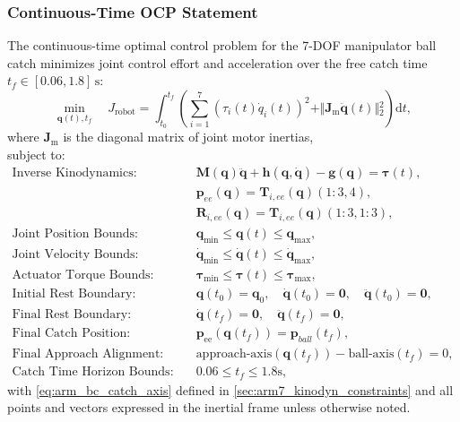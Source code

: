 \subsubsection{Continuous-Time OCP Statement}
The continuous-time optimal control problem for the 7-\ac{DOF} manipulator ball catch minimizes joint control effort and acceleration over the free catch time $t_f \in [0.06, 1.8]\,\text{s}$:   
\begin{equation}
\min_{\mathbf{q}(t), t_f} \quad J_{\text{robot}} = \int_{t_0}^{t_f} \left( \sum_{i=1}^{7} \left( \tau_i(t) \dot{q}_i(t) \right)^2 + \Vert{}\mathbf{J}_{\mathrm{m}}\ddot{\mathbf{q}}(t)\Vert{}_2^2 \right) \mathrm{d}t,
\label{eq:arm7_ocp_objective}
\end{equation}
where $\mathbf{J}_{\mathrm{m}}$ is the diagonal matrix of joint motor inertias, \\
subject to:
\begin{align}
\text{Inverse Kinodynamics:} \quad & \mathbf{M}(\mathbf{q})\ddot{\mathbf{q}} + \mathbf{h}(\mathbf{q}, \dot{\mathbf{q}}) - \mathbf{g}(\mathbf{q}) = \boldsymbol{\tau}(t), \label{eq:arm_dyn_constr} \\
                             \quad & \mathbf{p}_{ee}(\mathbf{q}) = \mathbf{T}_{i,ee}(\mathbf{q})(1\!:\!3,4), \\
                             \quad & \mathbf{R}_{i,ee}(\mathbf{q}) = \mathbf{T}_{i,ee}(\mathbf{q})(1\!:\!3,1\!:\!3), \\
\text{Joint Position Bounds:} \quad & \mathbf{q}_{\min} \le \mathbf{q}(t) \le \mathbf{q}_{\max}, \label{eq:arm_q_bounds} \\
\text{Joint Velocity Bounds:} \quad & \dot{\mathbf{q}}_{\min} \le \dot{\mathbf{q}}(t) \le \dot{\mathbf{q}}_{\max}, \label{eq:arm_dq_bounds} \\
\text{Actuator Torque Bounds:} \quad & \boldsymbol{\tau}_{\min} \le \boldsymbol{\tau}(t) \le \boldsymbol{\tau}_{\max}, \label{eq:arm_tau_bounds} \\
\text{Initial Rest Boundary:} \quad & \mathbf{q}(t_0) = \mathbf{q}_0, \quad \dot{\mathbf{q}}(t_0) = \mathbf{0}, \quad \ddot{\mathbf{q}}(t_0) = \mathbf{0}, \label{eq:arm_bc_start} \\
\text{Final Rest Boundary:} \quad & \dot{\mathbf{q}}(t_f) = \mathbf{0}, \quad \ddot{\mathbf{q}}(t_f) = \mathbf{0}, \label{eq:arm_bc_terminal_kin} \\
\text{Final Catch Position:} \quad & \mathbf{p}_{\text{ee}}(\mathbf{q}(t_f)) = \mathbf{p}_{ball}(t_f), \label{eq:arm_bc_catch_pos} \\
\text{Final Approach Alignment:} \quad & \text{approach-axis}(\mathbf{q}(t_f)) - \text{ball-axis}(t_f) = 0, \label{eq:arm_bc_catch_axis} \\
\text{Catch Time Horizon Bounds:} \quad & 0.06 \le t_f \le 1.8 \text{s}, \label{eq:arm_tf_bounds}
\end{align} 
with \cref{eq:arm_bc_catch_axis} defined in \cref{sec:arm7_kinodyn_constraints} and all points and vectors expressed in the inertial frame unless otherwise noted.

